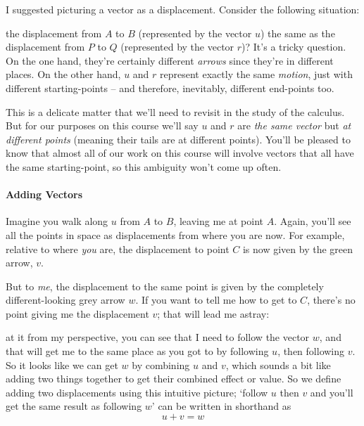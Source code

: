 \documentclass[oneside,english]{amsbook}
\numberwithin{section}{chapter}
\theoremstyle{plain}
\theoremstyle{definition}
\begin{document}
I suggested picturing a vector as a displacement. Consider the following
situation:

the displacement from $A$ to $B$ (represented by the vector $u$) the same
as the displacement from $P$ to $Q$ (represented by the vector $r$)? It's
a tricky question. On the one hand, they're certainly different
\emph{arrows} since they're in different places. On the other hand,
$u$ and $r$ represent exactly the same \emph{motion}, just with
different starting-points -- and therefore, inevitably, different
end-points too.

This is a delicate matter that we'll need to revisit in the study of the
calculus. But for our purposes on this course we'll say $u$ and
$r$ are \emph{the same vector} but \emph{at different points}
(meaning their tails are at different points). You'll be pleased to know
that almost all of our work on this course will involve vectors that all
have the same starting-point, so this ambiguity won't come up often.

\paragraph{Adding Vectors}


Imagine you walk along $u$ from $A$ to $B$, leaving me at point $A$. Again,
you'll see all the points in space as displacements from where you are
now. For example, relative to where \emph{you} are, the displacement to
point $C$ is now given by the green arrow, $v$.

But to \emph{me}, the displacement to the same point is given by the
completely different-looking grey arrow $w$. If you want to tell me
how to get to $C$, there's no point giving me the displacement $v$;
that will lead me astray:

at it from my perspective, you can see that I need to follow the vector
$w$, and that will get me to the same place as you got to by
following $u$, then following $v$. So it looks like we can get
$w$ by combining $u$ and $v$, which sounds a bit like adding
two things together to get their combined effect or value. So we define
adding two displacements using this intuitive picture; `follow $u$
then $v$ and you'll get the same result as following $w$' can be
written in shorthand as
\[
	u + v = w
\]
\end{document}
